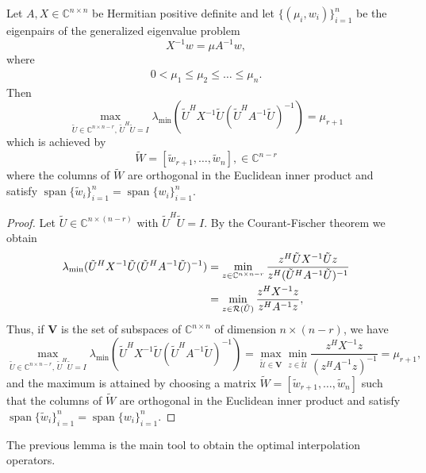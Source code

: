 \documentclass[final]{siamltex}
\newcommand{\innCnn}{\in\mathbb{C}^{n\times n}}
\newcommand{\innbCnnmr}{\in\mathbb{C}^{n\times n-r}}
\DeclareMathOperator*{\spann}{span}
\newcommand{\beq}{\begin{eqnarray}}
\newcommand{\eeq}{\end{eqnarray}}
\numberwithin{equation}{section}
\newcommand{\im} {{\cal R}}
\newcommand{\C}{\mathbb{C}}
\newcommand{\Cnn}{\mathbb{C}^{n \times n}}
\newcommand{\Cnnr}{\mathbb{C}^{n \times n-r}}
\begin{document}
\begin{lemma} \label{theo:main}
Let $A, X \innCnn$ be Hermitian positive definite and let
$\{(\mu_i,w_i)\}_{i=1}^n$ be the eigenpairs of the generalized eigenvalue
problem
 \[X^{-1}w = \mu
A^{-1}w,\]
where
\beq
0 < \mu_1 \leq \mu_2 \leq \ldots \leq  \mu_n.
\eeq
Then
\[\max_{\tilde U \innbCnnmr, \, \tilde U^H \tilde U=I} \lambda_{\min} (\tilde
U^HX^{-1}\tilde U
(\tilde
U^HA^{-1}\tilde U)^{-1}) = \mu_{r+1}
\]
which is achieved by 
\[
\tilde W = [\tilde{w}_{r+1}, \ldots, \tilde{w}_n],
\in \C^{n-r}\] 
where the columns of $\tilde W$ are orthogonal in the Euclidean inner 
product and satisfy
$\spann\{\tilde{w}_i\}_{i=1}^n = \spann\{w_i\}_{i=1}^n$.
\end{lemma}

\begin{proof}
Let $\tilde{U} \in \C^{n \times (n-r)}$ with $\tilde{U}^H\tilde{U} = I$. By the
Courant-Fischer theorem we obtain 
\begin{align*}
\lambda_{\min} (\tilde U^HX^{-1}\tilde U (\tilde U^HA^{-1}\tilde U)^{-1}) & =
\min_{z \in \Cnnr} \frac{z^H \tilde U X^{-1} \tilde U z }{ z^H
(\tilde U^H A^{-1} \tilde U)^{-1}}\\
& = \min_{ z \in \im(\tilde U)}\frac{z^{H} X^{-1}z}{z^HA^{-1}z}, 
\end{align*}
Thus, if $\mathbf{V}$ is the set of subspaces of $\Cnn$ of dimension $n \times
(n-r)$, we have
\[\max_{\tilde{U} \in \Cnnr, \, \tilde{U}^H\tilde U = I }
\lambda_{\min} (\tilde U^HX^{-1}\tilde U (\tilde U^HA^{-1}\tilde U)^{-1}) =
\max_{\tilde{\mathcal{U}} \in \mathbf V } \min_{z \in \tilde{\mathcal{U}}}
\frac{z^H X^{-1} z}{(z^HA^{-1}z)^{-1}}  = \mu_{r+1},
\]
and the maximum is attained by choosing a matrix $\tilde W =
[\tilde w_{r+1}, \ldots, \tilde w _{n}]$ such that 
the columns of $\tilde W$ are orthogonal in the Euclidean inner 
product and satisfy
$\spann\{\tilde{w}_i\}_{i=1}^n = \spann\{w_i\}_{i=1}^n$. 
\end{proof}

The previous lemma is the main tool to obtain the optimal interpolation
operators.
\end{document}
